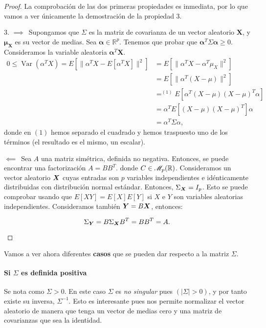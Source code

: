 \begin{proof}
  La comprobación de las dos primeras propiedades es inmediata, por lo que vamos a ver únicamente la demostración de la propiedad 3.
  \begin{nlist}
    \item[3.] $\boxed{\implies}\,$ Supongamos que $\Sigma$ es la matriz de covarianza de un vector aleatorio $\boldsymbol X$, y $\boldsymbol \mu_{\boldsymbol X}$ es su vector de medias. Sea $\boldsymbol \alpha \in \mathbb R^p$. Tenemos que probar que $\boldsymbol \alpha^T \Sigma \boldsymbol \alpha \geq 0$. Consideramos la variable aleatoria $\boldsymbol \alpha^T \boldsymbol X$. \begin{align*}
      0 \leq \operatorname{Var}(\alpha^T X) = E\left[\|\alpha^T X - E[\alpha^T X]\|^2\right] &= E\left[\|\alpha^T X - \alpha^T \mu_X\|^2\right] \\ 
        &= E\left[\|\alpha^T(X-\mu)\|^2\right]\\ 
        &=^{(1)} E\left[\alpha^T(X-\mu)(X-\mu)^T \alpha\right] \\
        &= \alpha^T E\left[(X-\mu)(X-\mu)^T\right] \alpha \\
        &= \alpha^T \Sigma \alpha,
    \end{align*} donde en $(1)$ hemos separado el cuadrado y hemos traspuesto uno de los términos (el resultado es el mismo, un escalar).

    $\boxed{\impliedby}\,$ Sea $A$ una matriz simétrica, definida no negativa. Entonces, se puede encontrar una factorización $A = B B^T$. donde $C \in \mathscr{M}_{p}(\mathbb{R})$.
    Consideramos un vector aleatorio $\boldsymbol{X}$ cuyas entradas son $p$ variables independientes e idénticamente distribuidas con distribución normal estándar. Entonces, $\Sigma_{\boldsymbol{X}} = I_p$. Esto se puede comprobar usando que $E[XY] = E[X]E[Y]$ si $X$ e $Y$ son variables aleatorias independientes. Consideramos también $\boldsymbol{Y} = B\boldsymbol{X}$, entonces:

    \[
       \Sigma_{\boldsymbol{Y}} = B\Sigma_{\boldsymbol{X}} B^T = B B^T = A
    .\]

  \end{nlist}
\end{proof}

Vamos a ver ahora diferentes \textbf{casos} que se pueden dar respecto a la matriz $\Sigma$.

\paragraph{Si $\Sigma$ es definida positiva} Se nota como $\Sigma > 0$. En este caso $\Sigma$ es \emph{no singular} pues $(|\Sigma| > 0)$, y por tanto existe su inversa, $\Sigma^{-1}$. Esto es interesante pues nos permite normalizar el vector aleatorio de manera que tenga un vector de medias cero y una matriz de covarianzas que sea la identidad.

